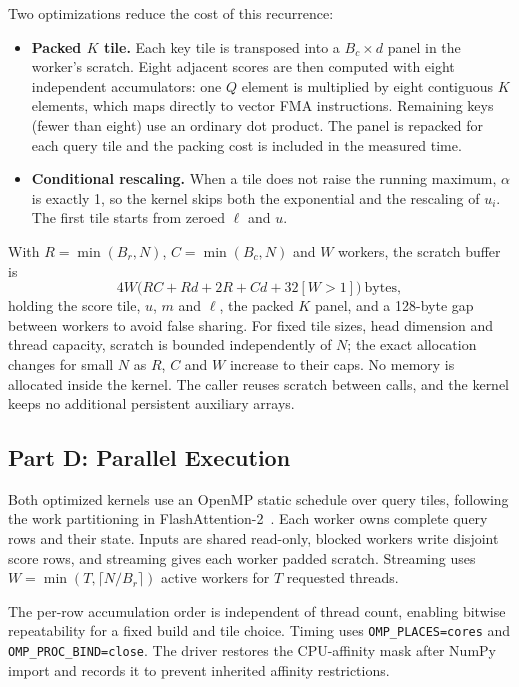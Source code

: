 \documentclass[11pt,a4paper]{article}
\begin{document}
Two optimizations reduce the cost of this recurrence:
\begin{itemize}
\item \textbf{Packed $K$ tile.} Each key tile is transposed into a
  $B_c\times d$ panel in the worker's scratch. Eight adjacent scores are then
  computed with eight independent accumulators: one $Q$ element is multiplied
  by eight contiguous $K$ elements, which maps directly to vector FMA
  instructions. Remaining keys (fewer than eight) use an ordinary dot product.
  The panel is repacked for each query tile and the packing cost is included in
  the measured time.
\item \textbf{Conditional rescaling.} When a tile does not raise the running
  maximum, $\alpha$ is exactly 1, so the kernel skips both the exponential and
  the rescaling of $u_i$. The first tile starts from zeroed $\ell$ and $u$.
\end{itemize}

With $R=\min(B_r,N)$, $C=\min(B_c,N)$ and $W$ workers, the scratch buffer is
\[
4W\bigl(RC + Rd + 2R + Cd + 32[W>1]\bigr)\ \text{bytes},
\]
holding the score tile, $u$, $m$ and $\ell$, the packed $K$ panel, and a
128-byte gap between workers to avoid false sharing. For fixed tile sizes,
head dimension and thread capacity, scratch is bounded independently of $N$;
the exact allocation changes for small $N$ as $R$, $C$ and $W$ increase to their
caps. No memory is allocated inside the kernel. The caller reuses scratch
between calls, and the kernel keeps no additional persistent auxiliary arrays.

\subsection{Part D: Parallel Execution}
Both optimized kernels use an OpenMP static schedule over query tiles,
following the work partitioning in FlashAttention-2~\cite{dao2023}.
Each worker owns complete query rows and their state. Inputs are shared
read-only, blocked workers write disjoint score rows, and streaming gives
each worker padded scratch. Streaming uses
$W=\min(T,\lceil N/B_r\rceil)$ active workers for $T$ requested threads.

The per-row accumulation order is independent of thread count, enabling
bitwise repeatability for a fixed build and tile choice.
Timing uses \texttt{OMP\_PLACES=cores} and \texttt{OMP\_PROC\_BIND=close}.
The driver restores the CPU-affinity mask after NumPy import and records it
to prevent inherited affinity restrictions.
\end{document}
